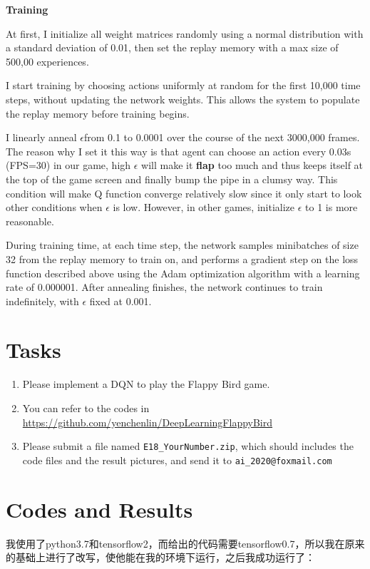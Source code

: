 \documentclass[a4paper, 11pt]{article}
\begin{document}
\textbf{Training}

At first, I initialize all weight matrices randomly using a normal distribution with a standard deviation of 0.01, then set the replay memory with a max size of 500,00 experiences.

I start training by choosing actions uniformly at random for the first 10,000 time steps, without updating the network weights. This allows the
system to populate the replay memory before training begins.

I linearly anneal $\epsilon$from 0.1 to 0.0001 over the course of the next 3000,000 frames. The reason why I set it this way is that agent can choose an action every 0.03s (FPS=30) in our game, high $\epsilon$ will make it \textbf{flap} too much and thus keeps itself at the top of the game screen and finally bump the pipe in a clumsy way. This condition will make Q function converge relatively slow since it only start to look other conditions when $\epsilon$ is low. However, in other games, initialize $\epsilon$ to 1 is more reasonable.

During training time, at each time step, the network samples minibatches of size 32 from the replay memory to train on, and performs a gradient step on the loss function described above using the Adam optimization
algorithm with a learning rate of 0.000001. After annealing finishes, the network continues to train indefinitely, with $\epsilon$ fixed at 0.001.

\section{Tasks}
\begin{enumerate}
	\item Please implement a DQN to play the Flappy Bird game.
	\item You can refer to the codes in \url{https://github.com/yenchenlin/DeepLearningFlappyBird}
	\item Please submit a file named \texttt{E18\_YourNumber.zip}, which should includes the code files and the result pictures, and send it to \texttt{ai\_2020@foxmail.com}
\end{enumerate}
\section{Codes and Results}

我使用了python3.7和tensorflow2，而给出的代码需要tensorflow0.7，所以我在原来的基础上进行了改写，使他能在我的环境下运行，之后我成功运行了：
\end{document}
